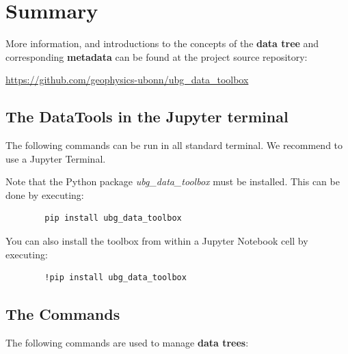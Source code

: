 \documentclass[fontsize=12]{scrartcl}
\begin{document}
\section{Summary}

More information, and introductions to the concepts of the \textbf{data tree}
and corresponding \textbf{metadata} can be found at the project source
repository:

\url{https://github.com/geophysics-ubonn/ubg_data_toolbox}

\subsection{The DataTools in the Jupyter terminal}

The following commands can be run in all standard terminal. We recommend to use
a Jupyter Terminal.

Note that the Python package \textsl{ubg_data_toolbox} must be installed. This
can be done by executing:

\begin{verbatim}
		pip install ubg_data_toolbox
\end{verbatim}

You can also install the toolbox from within a Jupyter Notebook cell by
executing:

\begin{verbatim}
		!pip install ubg_data_toolbox
\end{verbatim}


\subsection{The Commands}

The following commands are used to manage \textbf{data trees}:
\end{document}
